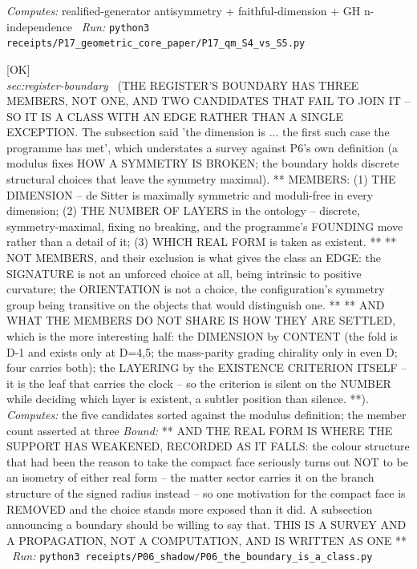 \begin{description}
\emph{Computes:} realified-generator antisymmetry + faithful-dimension + GH n-independence
\ \emph{Run:} \texttt{python3 receipts/P17\_geometric\_core\_paper/P17\_qm\_S4\_vs\_S5.py}
\item[\label{rcpt:P06_the_boundary_is_a_class}\texttt{P06\_the\_boundary\_is\_a\_class}]\hfill\textsf{[OK]}\\
\textit{sec:register-boundary} \ (THE REGISTER'S BOUNDARY HAS THREE MEMBERS, NOT ONE, AND TWO CANDIDATES THAT FAIL TO JOIN IT -- SO IT IS A CLASS WITH AN EDGE RATHER THAN A SINGLE EXCEPTION. The subsection said 'the dimension is ... the first such case the programme has met', which understates a survey against P6's own definition (a modulus fixes HOW A SYMMETRY IS BROKEN; the boundary holds discrete structural choices that leave the symmetry maximal). ** MEMBERS: (1) THE DIMENSION -- de Sitter is maximally symmetric and moduli-free in every dimension; (2) THE NUMBER OF LAYERS in the ontology -- discrete, symmetry-maximal, fixing no breaking, and the programme's FOUNDING move rather than a detail of it; (3) WHICH REAL FORM is taken as existent. ** ** NOT MEMBERS, and their exclusion is what gives the class an EDGE: the SIGNATURE is not an unforced choice at all, being intrinsic to positive curvature; the ORIENTATION is not a choice, the configuration's symmetry group being transitive on the objects that would distinguish one. ** ** AND WHAT THE MEMBERS DO NOT SHARE IS HOW THEY ARE SETTLED, which is the more interesting half: the DIMENSION by CONTENT (the fold is D-1 and exists only at D=4,5; the mass-parity grading chirality only in even D; four carries both); the LAYERING by the EXISTENCE CRITERION ITSELF -- it is the leaf that carries the clock -- so the criterion is silent on the NUMBER while deciding which layer is existent, a subtler position than silence. **). 
\emph{Computes:} the five candidates sorted against the modulus definition; the member count asserted at three
 \emph{Bound:} ** AND THE REAL FORM IS WHERE THE SUPPORT HAS WEAKENED, RECORDED AS IT FALLS: the colour structure that had been the reason to take the compact face seriously turns out NOT to be an isometry of either real form -- the matter sector carries it on the branch structure of the signed radius instead -- so one motivation for the compact face is REMOVED and the choice stands more exposed than it did. A subsection announcing a boundary should be willing to say that. THIS IS A SURVEY AND A PROPAGATION, NOT A COMPUTATION, AND IS WRITTEN AS ONE **
\ \emph{Run:} \texttt{python3 receipts/P06\_shadow/P06\_the\_boundary\_is\_a\_class.py}

\end{description}
